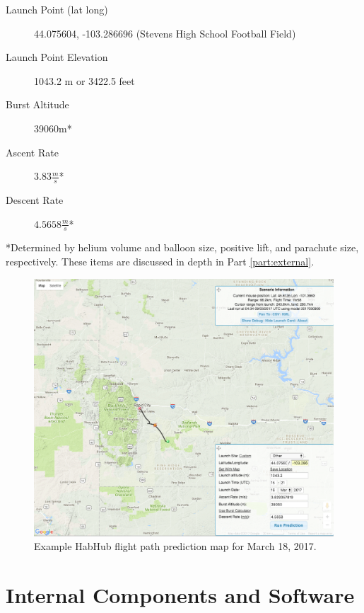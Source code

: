 \documentclass[english]{report}
\begin{document}
\begin{description}

\item [Launch Point (lat long)] 44.075604, -103.286696 (Stevens High School Football Field)
\item [Launch Point Elevation] 1043.2 m or 3422.5 feet
\item [Burst Altitude] 39060m*
\item [Ascent Rate] $3.83 \si{\frac{m}{s}}$*
\item [Descent Rate] $4.5658\si{\frac{m}{s}}$*
\end{description}
*Determined by helium volume and balloon size, positive lift, and parachute size, respectively.  These items are discussed in depth in Part \ref{part:external}.

\begin{figure}[H]
\begin{centering}
\includegraphics[scale=0.4]{./images/habhub}
\par\end{centering}
\caption{Example HabHub flight path prediction map for March 18, 2017.}
\end{figure}



\part{Internal Components and Software}
\label{internal_components}
\end{document}
